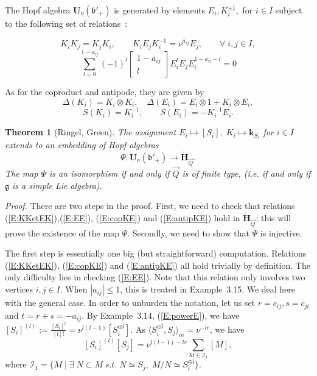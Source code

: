 \documentclass[a4paper,10pt]{amsart}
\def\U{\mathbf{U}}
\def\g{\mathfrak{g}}
\def\bo{\mathfrak{b}}
\def\v{\nu}
\newtheorem{theo}{\bf{Theorem}}[section]
\numberwithin{equation}{section}
\begin{document}
The Hopf algebra  $\U_\nu(\bo'_+)$ is generated by elements $E_i, K_i^{\pm 1},$ for $i \in I$ subject to the following set of relations~:

\vspace{.05in}

\begin{equation}\label{E:KKetEK}
K_i K_j=K_j K_i, \qquad
K_i E_j K_i^{-1}=\v^{a_{ij}} E_j, \qquad
\forall\; i,j \in I,
\end{equation}
\begin{equation}\label{E:EE}
\sum_{l=0}^{1-a_{ij}} (-1)^l \begin{bmatrix} 1-a_{ij} \\ l \end{bmatrix} E_i^l E_j E_i^{1-a_{ij}-l}=0
\end{equation}

\vspace{.05in}

As for the coproduct and antipode, they are given by
\begin{equation}\label{E:copKE}
\Delta(K_i)=K_i \otimes K_i, \quad \Delta(E_i)=E_i \otimes 1 + K_i \otimes E_i,
\end{equation}
\begin{equation}\label{E:antipKE}
S(K_i)=K_i^{-1}, \qquad S(E_i)=-K_i^{-1}E_i.
\end{equation}

\vspace{.1in}

\begin{theo}[Ringel, Green]\label{T:RingelHall} The assignment $E_i \mapsto [S_i],\; K_i \mapsto \mathbf{k}_{S_i}$ for $i \in I$ extends to an embedding of Hopf algebras
$$\Psi: \U_{\nu}(\bo'_+) \to \widetilde{\mathbf{H}}_{\vec{Q}}.$$
The map $\Psi$ is an isomorphism if and only if $\vec{Q}$ is of finite type, (i.e. if and only if $\g$ is a simple Lie algebra).
\end{theo}

\noindent
\textit{Proof.} There are two steps in the proof. First, we need to check that relations (\ref{E:KKetEK}),(\ref{E:EE}), (\ref{E:copKE}) and (\ref{E:antipKE}) hold in $\widetilde{\mathbf{H}}_{\vec{Q}}$; this will prove the existence of the map $\Psi$. Secondly, we need to show that $\Psi$ is injective.

\vspace{.1in}

The first step is essentially one big (but straightforward) computation. Relations (\ref{E:KKetEK}), (\ref{E:copKE}) and (\ref{E:antipKE}) all hold trivially by definition. The only difficulty lies in checking (\ref{E:EE}). Note that this relation only involves two vertices $i,j \in I$. When $|a_{ij}| \leq 1$, this is treated in Example~3.15. We deal here with the general case.
In order to unburden the notation, let us set $r=c_{ij}, s=c_{ji}$ and $t=r+s=-a_{ij}$. By Example~3.14, (\ref{E:powerE}), we have
$[S_i]^{(l)}:=\frac{[S_i]^l}{[l]!}=\v^{l(l-1)} [S_i^{\oplus l}]$. As $\langle S_i^{\oplus l},S_j\rangle_m=\v^{-lr}$, we have
$$[S_i]^{(l)}[S_{j}]=\v^{l(l-1)-lr}\sum_{M \in
\mathcal{I}_1}[M],$$ where $\mathcal{I}_1=\{M\;|\;\exists \;N \subset M
\;s.t.\; N \simeq S_{j},  \; M/N \simeq S_i^{\oplus l}\}$.
\end{document}

